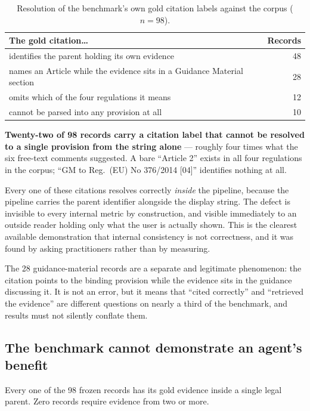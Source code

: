 \begin{table}[htbp]
  \centering
  \caption{Resolution of the benchmark's own gold citation labels against the corpus ($n = 98$).}
  \label{tab:legibility}
  \begin{tabular}{lr}
    \toprule
    \textbf{The gold citation\ldots} & \textbf{Records} \\
    \midrule
    identifies the parent holding its own evidence & 48 \\
    names an Article while the evidence sits in a Guidance Material section & 28 \\
    omits which of the four regulations it means & 12 \\
    cannot be parsed into any provision at all & 10 \\
    \bottomrule
  \end{tabular}
\end{table}

\textbf{Twenty-two of 98 records carry a citation label that cannot be resolved to
a single provision from the string alone} --- roughly four times what the six
free-text comments suggested. A bare \enquote{Article 2} exists in all four
regulations in the corpus; \enquote{GM to Reg.\ (EU) No 376/2014 [04]} identifies
nothing at all.

Every one of these citations resolves correctly \emph{inside} the pipeline,
because the pipeline carries the parent identifier alongside the display string.
The defect is invisible to every internal metric by construction, and visible
immediately to an outside reader holding only what the user is actually shown.
This is the clearest available demonstration that internal consistency is not
correctness, and it was found by asking practitioners rather than by measuring.

The 28 guidance-material records are a separate and legitimate phenomenon: the
citation points to the binding provision while the evidence sits in the guidance
discussing it. It is not an error, but it means that \enquote{cited correctly} and
\enquote{retrieved the evidence} are different questions on nearly a third of the
benchmark, and results must not silently conflate them.

\subsection{The benchmark cannot demonstrate an agent's benefit}

Every one of the 98 frozen records has its gold evidence inside a single legal
parent. Zero records require evidence from two or more.

